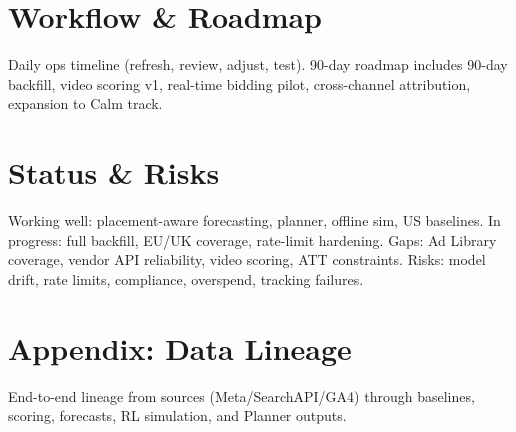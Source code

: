 \documentclass[11pt,a4paper]{report}
\begin{document}
\chapter{Workflow \& Roadmap}
Daily ops timeline (refresh, review, adjust, test). 90-day roadmap includes 90-day backfill, video scoring v1, real-time bidding pilot, cross-channel attribution, expansion to Calm track.

\chapter{Status \& Risks}
Working well: placement-aware forecasting, planner, offline sim, US baselines. In progress: full backfill, EU/UK coverage, rate-limit hardening. Gaps: Ad Library coverage, vendor API reliability, video scoring, ATT constraints. Risks: model drift, rate limits, compliance, overspend, tracking failures.

\chapter{Appendix: Data Lineage}
End-to-end lineage from sources (Meta/SearchAPI/GA4) through baselines, scoring, forecasts, RL simulation, and Planner outputs.
\end{document}
